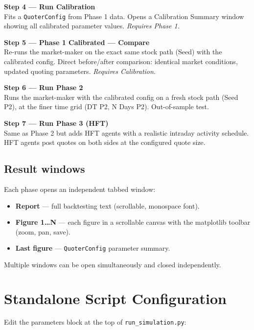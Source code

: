 \documentclass[12pt,a4paper]{article}
\begin{document}
\medskip
\noindent\textbf{Step 4 --- Run Calibration}\\
Fits a \texttt{QuoterConfig} from Phase 1 data. Opens a Calibration Summary
window showing all calibrated parameter values. \textit{Requires Phase 1.}

\medskip
\noindent\textbf{Step 5 --- Phase 1 Calibrated --- Compare}\\
Re-runs the market-maker on the exact same stock path (Seed) with the calibrated
config. Direct before/after comparison: identical market conditions, updated
quoting parameters. \textit{Requires Calibration.}

\medskip
\noindent\textbf{Step 6 --- Run Phase 2}\\
Runs the market-maker with the calibrated config on a fresh stock path (Seed P2),
at the finer time grid (DT P2, N Days P2). Out-of-sample test.

\medskip
\noindent\textbf{Step 7 --- Run Phase 3 (HFT)}\\
Same as Phase 2 but adds HFT agents with a realistic intraday activity schedule.
HFT agents post quotes on both sides at the configured quote size.

\subsection*{Result windows}

Each phase opens an independent tabbed window:
\begin{itemize}
  \item \textbf{Report} --- full backtesting text (scrollable, monospace font).
  \item \textbf{Figure 1\ldots N} --- each figure in a scrollable canvas with the
        matplotlib toolbar (zoom, pan, save).
  \item \textbf{Last figure} --- \texttt{QuoterConfig} parameter summary.
\end{itemize}

Multiple windows can be open simultaneously and closed independently.

\section{Standalone Script Configuration}
\label{sec:script}

Edit the parameters block at the top of \texttt{run\_simulation.py}:
\end{document}
